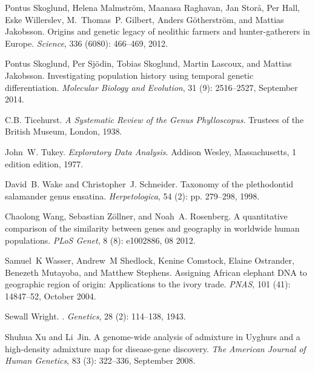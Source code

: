 \documentclass[10pt,letterpaper]{article}
\begin{document}
\begin{thebibliography}{80}
Pontus Skoglund, Helena Malmstr{\"o}m, Maanasa Raghavan, Jan Stor{\aa}, Per
  Hall, Eske Willerslev, M.~Thomas~P. Gilbert, Anders G{\"o}therstr{\"o}m, and
  Mattias Jakobsson.
\newblock Origins and genetic legacy of neolithic farmers and hunter-gatherers
  in {Europe}.
\newblock \emph{Science}, 336 (6080): 466--469, 2012.

Pontus Skoglund, Per Sjödin, Tobias Skoglund, Martin Lascoux, and Mattias
  Jakobsson.
\newblock Investigating population history using temporal genetic
  differentiation.
\newblock \emph{Molecular Biology and Evolution}, 31 (9):
  2516--2527, September 2014.

C.B. Ticehurst.
\newblock \emph{A Systematic Review of the Genus Phylloscopus}.
\newblock Trustees of the British Museum, London, 1938.

John~W. Tukey.
\newblock \emph{Exploratory Data Analysis}.
\newblock Addison Wesley, Massachusetts, 1 edition edition, 1977.

David~B. Wake and Christopher~J. Schneider.
\newblock Taxonomy of the plethodontid salamander genus ensatina.
\newblock \emph{Herpetologica}, 54 (2): pp. 279--298, 1998.

Chaolong Wang, Sebastian Zöllner, and Noah~A. Rosenberg.
\newblock A quantitative comparison of the similarity between genes and
  geography in worldwide human populations.
\newblock \emph{PLoS Genet}, 8 (8): e1002886, 08 2012.

Samuel~K Wasser, Andrew~M Shedlock, Kenine Comstock, Elaine Ostrander, Benezeth
  Mutayoba, and Matthew Stephens.
\newblock Assigning {African} elephant {DNA} to geographic region of origin:
  {Applications} to the ivory trade.
\newblock \emph{PNAS}, 101 (41): 14847--52, October 2004.

Sewall Wright.
.
\newblock \emph{Genetics}, 28 (2): 114--138, 1943.

Shuhua Xu and Li~Jin.
\newblock A genome-wide analysis of admixture in {Uyghurs} and a high-density
  admixture map for disease-gene discovery.
\newblock \emph{The American Journal of Human Genetics}, 83
  (3): 322--336, September 2008.


\end{thebibliography}
\end{document}
